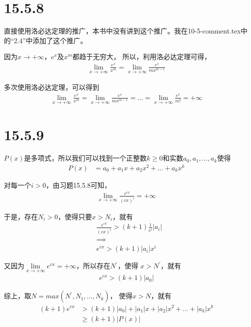 \documentclass{article}
\begin{document}
\section*{15.5.8}

直接使用洛必达定理的推广，本书中没有讲到这个推广。我在10-5-comment.tex中的“2.4”中添加了这个推广。

因为$x \to +\infty$，$e^x$及$x^m$都趋于无穷大，
所以，利用洛必达定理可得，
\begin{align*}
  \lim\limits_{x \to +\infty} \frac{e^x}{x^m}
  =
  \lim\limits_{x \to +\infty} \frac{e^x}{mx^{m - 1}}
\end{align*}

多次使用洛必达定理，可以得到
\begin{align*}
  \lim\limits_{x \to +\infty} \frac{e^x}{x^m}
  =
  \lim\limits_{x \to +\infty} \frac{e^x}{mx^{m - 1}}
  =
  ...
  =
  \lim\limits_{x \to +\infty} \frac{e^x}{m!}
  = +\infty
\end{align*}

\section*{15.5.9}


$P(x)$是多项式，所以我们可以找到一个正整数$k \geq 0$和实数$a_0, a_1, \dots, a_k$使得
\begin{align*}
  P(x) & = a_0 + a_1x + a_2x^2 + \dots + a_kx^k
\end{align*}

对每一个$i > 0$，由习题15.5.8可知，
\begin{align*}
  \lim\limits_{x \to +\infty} \frac{e^{cx}}{(cx)^i} = +\infty
\end{align*}

于是，存在$N_i > 0$，使得只要$x > N_i$，就有
\begin{align*}
   & \frac{e^{cx}}{(cx)^i} > (k + 1)\frac{1}{c^i}|a_i| \\
   & \implies                                          \\
   & e^{cx} > (k + 1) |a_i| x^i
\end{align*}

又因为$\lim\limits_{x \to +\infty} e^{cx} = +\infty$，所以存在$N^\prime$，使得
$x > N^\prime$，就有
\begin{align*}
  e^{cx} > (k + 1)|a_0|
\end{align*}

综上，取$N = max(N^\prime, N_1, \dots, N_k)$，
使得$x > N$，就有
\begin{align*}
  (k + 1)e^{cx} & > (k+1) |a_0| + |a_1|x + |a_2|x^2 + \dots + |a_k|x^k \\
                & \geq (k + 1) |P(x)|                                  \\
\end{align*}
\end{document}
